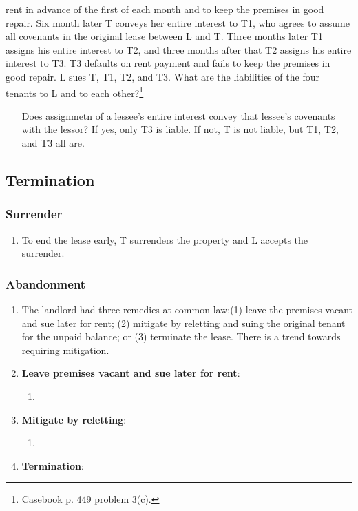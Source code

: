 \begin{enumerate}
    rent in advance of the first of each month and to keep the premises in 
    good repair. Six month later T conveys her entire interest to T1, who 
    agrees to assume all covenants in the original lease between L and T. 
    Three months later T1 assigns his entire interest to T2, and three months 
    after that T2 assigns his entire interest to T3.  T3 defaults on rent 
    payment and fails to keep the premises in good repair. L sues T, T1, T2, 
    and T3. What are the liabilities of the four tenants to L and to each 
    other?\footnote{Casebook p. 449 problem 3(c).}
    \begin{enumerate}
        \item [Does assignmetn of a lessee's entire interest convey that 
        lessee's covenants with the lessor? If yes, only T3 is liable. If not, 
        T is not liable, but T1, T2, and T3 all are.]
    \end{enumerate}
\end{enumerate}

\subsection{Termination} %

\subsubsection{Surrender}

\begin{enumerate}
    \item To end the lease early, T surrenders the property and L accepts the 
    surrender.
\end{enumerate}

\subsubsection{Abandonment} %

\begin{enumerate}
    \item The landlord had three remedies at common law:(1) leave the premises 
    vacant and sue later for rent; (2) mitigate by reletting and suing the 
    original tenant for the unpaid balance; or (3) terminate the lease. There 
    is a trend towards requiring mitigation.
    \item \textbf{Leave premises vacant and sue later for rent}:
    \begin{enumerate}
        \item %
    \end{enumerate}
    \item \textbf{Mitigate by reletting}:
    \begin{enumerate}
        \item %
    \end{enumerate}
    \item \textbf{Termination}:
\end{enumerate}

